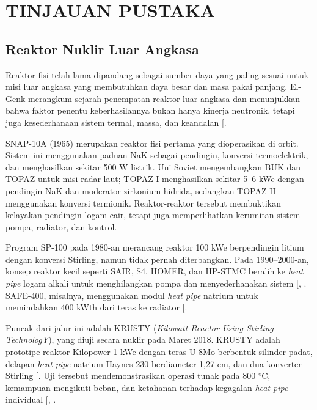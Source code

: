 \documentclass[
  indonesian,
  12pt,
  a4paper,
]{report}
\begin{document}
\chapter{TINJAUAN PUSTAKA}\label{sec-literature-review}

\section{Reaktor Nuklir Luar Angkasa}\label{reaktor-nuklir-luar-angkasa}

Reaktor fisi telah lama dipandang sebagai sumber daya yang paling sesuai
untuk misi luar angkasa yang membutuhkan daya besar dan masa pakai
panjang. El-Genk merangkum sejarah penempatan reaktor luar angkasa dan
menunjukkan bahwa faktor penentu keberhasilannya bukan hanya kinerja
neutronik, tetapi juga kesederhanaan sistem termal, massa, dan keandalan
{[}\citeproc{ref-elgenk2009}{1}{]}.

SNAP-10A (1965) merupakan reaktor fisi pertama yang dioperasikan di
orbit. Sistem ini menggunakan paduan NaK sebagai pendingin, konversi
termoelektrik, dan menghasilkan sekitar 500 W listrik. Uni Soviet
mengembangkan BUK dan TOPAZ untuk misi radar laut; TOPAZ-I menghasilkan
sekitar 5--6 kWe dengan pendingin NaK dan moderator zirkonium hidrida,
sedangkan TOPAZ-II menggunakan konversi termionik. Reaktor-reaktor
tersebut membuktikan kelayakan pendingin logam cair, tetapi juga
memperlihatkan kerumitan sistem pompa, radiator, dan kontrol.

Program SP-100 pada 1980-an merancang reaktor 100 kWe berpendingin
litium dengan konversi Stirling, namun tidak pernah diterbangkan. Pada
1990--2000-an, konsep reaktor kecil seperti SAIR, S4, HOMER, dan HP-STMC
beralih ke \emph{heat pipe} logam alkali untuk menghilangkan pompa dan
menyederhanakan sistem {[},
\citeproc{ref-mason2011}{9}{]}. SAFE-400, misalnya, menggunakan modul
\emph{heat pipe} natrium untuk memindahkan 400 kWth dari teras ke
radiator {[}\citeproc{ref-martin2004}{10}{]}.

Puncak dari jalur ini adalah KRUSTY (\emph{Kilowatt Reactor Using
Stirling TechnologY}), yang diuji secara nuklir pada Maret 2018. KRUSTY
adalah prototipe reaktor Kilopower 1 kWe dengan teras U-8Mo berbentuk
silinder padat, delapan \emph{heat pipe} natrium Haynes 230 berdiameter
1,27 cm, dan dua konverter Stirling
{[}\citeproc{ref-poston2020design}{4}{]}. Uji tersebut mendemonstrasikan
operasi tunak pada 800 °C, kemampuan mengikuti beban, dan ketahanan
terhadap kegagalan \emph{heat pipe} individual
{[}, \citeproc{ref-gibson2020}{6}{]}.
\end{document}
